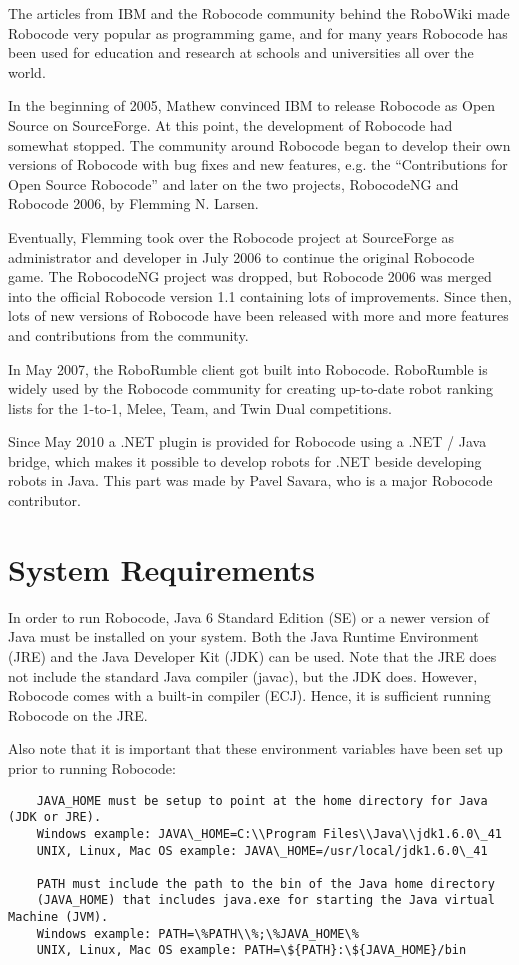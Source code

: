 \documentclass{scrreprt}
\begin{document}
The articles from IBM and the Robocode community behind the RoboWiki made Robocode very popular as programming game, and for many years Robocode has been used for education and research at schools and universities all over the world.

In the beginning of 2005, Mathew convinced IBM to release Robocode as Open Source on SourceForge. At this point, the development of Robocode had somewhat stopped. The community around Robocode began to develop their own versions of Robocode with bug fixes and new features, e.g. the ``Contributions for Open Source Robocode'' and later on the two projects, RobocodeNG and Robocode 2006, by Flemming N. Larsen.

Eventually, Flemming took over the Robocode project at SourceForge as administrator and developer in July 2006 to continue the original Robocode game. The RobocodeNG project was dropped, but Robocode 2006 was merged into the official Robocode version 1.1 containing lots of improvements. Since then, lots of new versions of Robocode have been released with more and more features and contributions from the community.

In May 2007, the RoboRumble client got built into Robocode. RoboRumble is widely used by the Robocode community for creating up-to-date robot ranking lists for the 1-to-1, Melee, Team, and Twin Dual competitions.

Since May 2010 a .NET plugin is provided for Robocode using a .NET / Java bridge, which makes it possible to develop robots for .NET beside developing robots in Java. This part was made by Pavel Savara, who is a major Robocode contributor.

\section{System Requirements}
In order to run Robocode, Java 6 Standard Edition (SE) or a newer version of Java must be installed on your system. Both the Java Runtime Environment (JRE) and the Java Developer Kit (JDK) can be used. Note that the JRE does not include the standard Java compiler (javac), but the JDK does. However, Robocode comes with a built-in compiler (ECJ). Hence, it is sufficient running Robocode on the JRE.

Also note that it is important that these environment variables have been set up prior to running Robocode:

\begin{verbatim}
    JAVA_HOME must be setup to point at the home directory for Java (JDK or JRE).
    Windows example: JAVA\_HOME=C:\\Program Files\\Java\\jdk1.6.0\_41
    UNIX, Linux, Mac OS example: JAVA\_HOME=/usr/local/jdk1.6.0\_41

    PATH must include the path to the bin of the Java home directory
    (JAVA_HOME) that includes java.exe for starting the Java virtual Machine (JVM).
    Windows example: PATH=\%PATH\\%;\%JAVA_HOME\%
    UNIX, Linux, Mac OS example: PATH=\${PATH}:\${JAVA_HOME}/bin
\end{verbatim}
\end{document}
